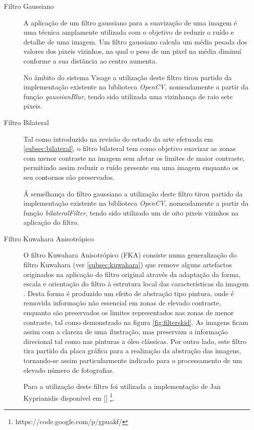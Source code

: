 \begin{description}
\item[Filtro Gaussiano]
A aplicação de um filtro gaussiano para a suavização de uma imagem é uma técnica amplamente utilizada com o objetivo de reduzir o ruído e detalhe de uma imagem. Um filtro gaussiano calcula um média pesada dos valores dos pixeis vizinhos, na qual o peso de um pixel na média diminuí conforme a sua distância ao centro aumenta.

No âmbito do sistema Visage a utilização deste filtro tirou partido da implementação existente na biblioteca \textit{OpenCV}, nomeadamente a partir da função \textit{gaussianBlur}, tendo sido utilizada uma vizinhança de raio sete pixeis.

\item[Filtro Bilateral]
Tal como introduzido na revisão do estado da arte efetuada em \ref{subsec:bilateral}, o filtro bilateral tem como objetivo suavizar as zonas com menor contraste na imagem sem afetar os limites de maior contraste, permitindo assim reduzir o ruído presente em uma imagem enquanto os seu contornos são preservados.

Á semelhança do filtro gaussiano a utilização deste filtro tirou partido da implementação existente na biblioteca \textit{OpenCV}, nomeadamente a partir da função \textit{bilateralFilter}, tendo sido utilizado um de oito pixeis vizinhos na aplicação do filtro.

\item[Filtro Kuwahara Anisotrópico]
O filtro Kuwahara Anisotrópico (FKA) consiste numa generalização do filtro Kuwahara (ver \ref{subsec:kuwahara}) que remove alguns artefactos originados na aplicação do filtro original através da adaptação da forma, escala e orientação do filtro à estrutura local das características da imagem \cite{Kyprianidis2009}. Desta forma é produzido um efeito de abstração tipo pintura, onde é removida informação não essencial em zonas de elevado contraste, enquanto são preservados os limites representados nas zonas de menor contraste, tal como demonstrado na figura \ref{fig:filterskid}. As imagens ficam assim com a clareza de uma ilustração, mas preservam a informação direcional tal como nas pinturas a óleo clássicas. Por outro lado, este filtro tira partido da placa gráfica para a realização da abstração das imagens, tornando-se assim particularmente indicado para o processamento de um elevado número de fotografias.

Para a utilização deste filtro foi utilizada a implementação de Jan Kyprianidis disponível em [] \footnote{https://code.google.com/p/gpuakf/}.

\end{description}
